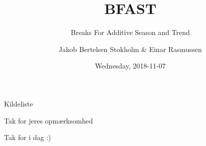 \documentclass{beamer}
\title{\textsc{BFAST}}
\subtitle{Breaks For Additive Season and Trend}
\date{Wednesday, 2018-11-07}
\author{Jakob Bertelsen Stokholm \& Einar Rasmussen}
\institute{DIKU}
\begin{document}
  \maketitle

  \begin{frame}{Kildeliste}

     \renewcommand*{\bibfont}{\scriptsize} \printbibliography

  \end{frame}

  \begin{frame}{Tak for jeres opmærksomhed}

      Tak for i dag :)

  \end{frame}
\end{document}
